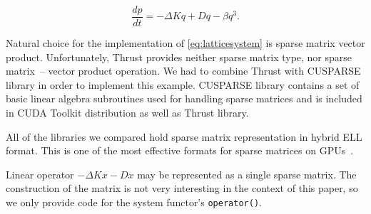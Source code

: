 \documentclass[1p]{elsarticle}
\newcommand{\code}[1]{\lstinline|#1|}
\newcommand {\de} {\mbox{d}}
\newcommand {\rem}[1]{}
\begin{document}
\rem{
Another example for our performance and usage study is a strongly
nonlinear disordered Hamiltonian lattice. Its equations of motion are
governed by
\begin{equation}
\frac{\de q_{i,j}}{\de t} = p_{i,j} \quad \text{,} \quad \quad \frac{\de p_{i,j}}{\de t} = - \omega_{i,j}^2 q_i - \beta q_{i,j}^3 + \Delta_d q_{i,j} \,\,\text{.}
\label{eq:disordered_ham}
\end{equation}
Here, $\Delta_d q_{i,j}$ denotes the two-dimensional discret Laplacian
$\Delta_d
q_{i,j}=q_{i+1,j}+q_{i-1,j}+q_{i,j+1}+q_{i,j-1}-4q_{i,j}$. Such
systems are widely used in theoretical physics to study phenomena
like Anderson localization or thermalization.

An important property of \eqref{eq:disordered_ham} is its Hamiltonian
nature. It can be obtained from a Hamiltonian and the energy and phase
volume is conserved during its evolution. To account for this
properties a special class of solvers exists -- symplectic
solvers. Odeint implements three different variants of such solvers,
all are of the Runge-Kutta-Nystrom type.
}

\begin{equation} \label{eq:latticesystem}
    \frac{dp}{dt} = -\Delta Kq + Dq - \beta q^3.
\end{equation}

Natural choice for the implementation of \eqref{eq:latticesystem} is sparse
matrix vector product. Unfortunately, Thrust provides neither sparse matrix
type, nor sparse matrix~-- vector product operation.  We had to combine Thrust
with CUSPARSE library in order to implement this example. CUSPARSE library
contains a set of basic linear algebra subroutines used for handling sparse
matrices and is included in CUDA Toolkit distribution as well as Thrust
library.

All of the libraries we compared hold sparse matrix  representation in hybrid
ELL format. This is one of the most effective formats for sparse matrices on
GPUs~\cite{BellGarland2008}.

Linear operator $-\Delta Kx-Dx$ may be represented as a single sparse matrix.
The construction of the matrix is not very interesting in the context of this
paper, so we only provide code for the system functor's \code{operator()}.
\end{document}

